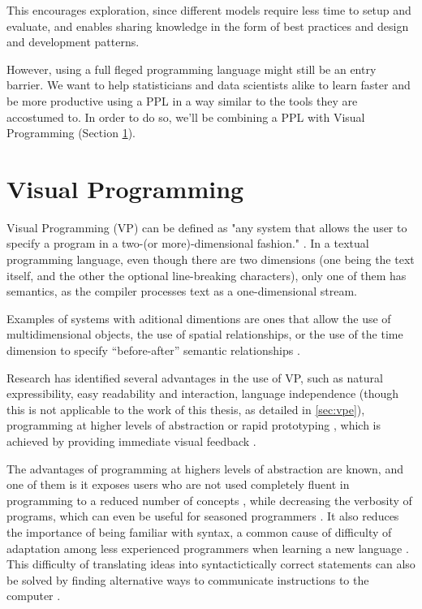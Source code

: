 \begin{itemsize}
This encourages exploration, since
different models require less time to setup and evaluate, and enables sharing
knowledge in the form of best practices and design and development patterns.

However, using a full fleged programming language might still be an entry
barrier. We want to help statisticians and data scientists alike to learn
faster and be more productive using a PPL in a way similar to the tools they
are accostumed to. In order to do so, we'll be combining a PPL with Visual
Programming (Section \ref{sec:vp}).

\section{Visual Programming}
\label{sec:vp}

Visual Programming (VP) can be defined as "any system that allows the user to specify a program in a
two-(or more)-dimensional fashion." \cite{Myers1986}.
In a textual programming language, even though there are two dimensions (one
being the text itself, and the other the optional line-breaking characters),
only one of them has semantics, as the compiler processes text as a
one-dimensional stream.

Examples of systems with aditional dimentions are ones that allow the use of
multidimensional objects, the use of spatial relationships, or the use of the
time dimension to specify “before-after” semantic relationships \cite{Burnett1999}.

Research has identified several advantages in the use of VP, such as natural
expressibility, easy readability and interaction, language independence (though
this is not applicable to the work of this thesis, as detailed in \ref{sec:vpe}),
programming at higher levels of abstraction or rapid prototyping \cite{JamalRahmanandWenzel2014},
which is achieved by providing immediate visual feedback \cite{Shu1988}.

The advantages of programming at highers levels of abstraction are known, and
one of them is it exposes users who are not used completely fluent in programming
to a reduced number of concepts \cite{Shu1988}, while decreasing the verbosity of
programs, which can even be useful for seasoned programmers \cite{Myers1990}.
It also reduces the importance of being familiar with syntax, a common cause
of difficulty of adaptation among less experienced programmers when learning
a new language \cite{cunniff1986does}\cite{Carlisle2005}. This difficulty of translating ideas
into syntactictically correct statements can also be solved by finding alternative
ways to communicate instructions to the computer \cite{Kelleher2005}.


\end{itemsize}
